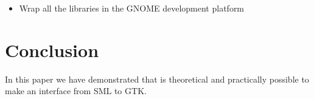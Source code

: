 \documentclass[workingdraft,endnotes]{usetex-v1}
\begin{document}
\begin{itemize}
\item Wrap all the libraries in the GNOME development platform
\end{itemize}



\section{Conclusion}
\label{sec:conclusion}

In this paper we have demonstrated that is theoretical and practically
possible to make an interface from SML to GTK.



\end{document}
